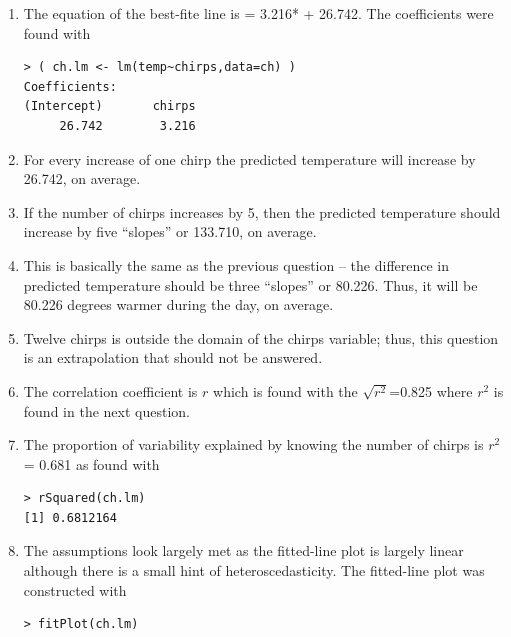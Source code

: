 \documentclass[10pt,openany]{book}\usepackage[]{graphicx}\usepackage[]{color}
\makeatletter
\newenvironment{kframe}{%
 \def\at@end@of@kframe{}%
 \ifinner\ifhmode%
  \def\at@end@of@kframe{\end{minipage}}%
  \begin{minipage}{\columnwidth}%
 \fi\fi%
 \def\FrameCommand##1{\hskip\@totalleftmargin \hskip-\fboxsep
 \colorbox{shadecolor}{##1}\hskip-\fboxsep
     \hskip-\linewidth \hskip-\@totalleftmargin \hskip\columnwidth}%
 \MakeFramed {\advance\hsize-\width
   \@totalleftmargin\z@ \linewidth\hsize
   \@setminipage}}%
 {\par\unskip\endMakeFramed%
 \at@end@of@kframe}
\newenvironment{knitrout}{}{} %
\makeatother
\begin{document}
\begin{itemize}
\begin{enumerate}
      \item The equation of the best-fite line is  = 3.216* + 26.742.  The coefficients were found with
\begin{knitrout}
\color{fgcolor}\begin{kframe}
\begin{verbatim}
> ( ch.lm <- lm(temp~chirps,data=ch) )
Coefficients:
(Intercept)       chirps  
     26.742        3.216  
\end{verbatim}
\end{kframe}
\end{knitrout}
      \item For every increase of one chirp the predicted temperature will increase by 26.742, on average.
      \item If the number of chirps increases by 5, then the predicted temperature should increase by five ``slopes'' or 133.710, on average.
      \item This is basically the same as the previous question -- the difference in predicted temperature should be three ``slopes'' or 80.226.  Thus, it will be 80.226 degrees warmer during the day, on average.
      \item Twelve chirps is outside the domain of the chirps variable; thus, this question is an extrapolation that should not be answered.
      \item The correlation coefficient is $r$ which is found with the $\sqrt{r^{2}}$=0.825 where $r^{2}$ is found in the next question.
      \item The proportion of variability explained by knowing the number of chirps is $r^{2}$ = 0.681 as found with
\begin{knitrout}
\color{fgcolor}\begin{kframe}
\begin{verbatim}
> rSquared(ch.lm)
[1] 0.6812164
\end{verbatim}
\end{kframe}
\end{knitrout}
      \item The assumptions look largely met as the fitted-line plot  is largely linear although there is a small hint of heteroscedasticity.  The fitted-line plot was constructed with
\begin{knitrout}
\color{fgcolor}\begin{kframe}
\begin{verbatim}
> fitPlot(ch.lm)
\end{verbatim}
\end{kframe}\begin{figure}[hbtp]


\end{figure}
\end{knitrout}
\end{enumerate}
\end{itemize}
\end{document}
